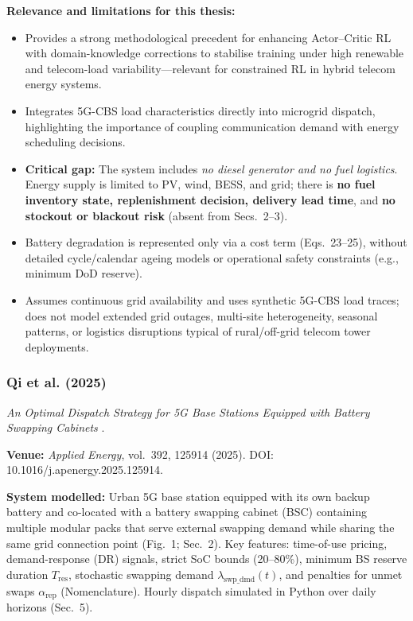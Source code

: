 \textbf{Relevance and limitations for this thesis:}
\begin{itemize}
    \item Provides a strong methodological precedent for enhancing Actor--Critic RL with domain-knowledge corrections to stabilise training under high renewable and telecom-load variability—relevant for constrained RL in hybrid telecom energy systems.
    \item Integrates 5G-CBS load characteristics directly into microgrid dispatch, highlighting the importance of coupling communication demand with energy scheduling decisions.
    \item \textbf{Critical gap:} The system includes \emph{no diesel generator and no fuel logistics}. Energy supply is limited to PV, wind, BESS, and grid; there is \textbf{no fuel inventory state, replenishment decision, delivery lead time}, and \textbf{no stockout or blackout risk} (absent from Secs.~2--3).
    \item Battery degradation is represented only via a cost term (Eqs.~23--25), without detailed cycle/calendar ageing models or operational safety constraints (e.g., minimum DoD reserve).
    \item Assumes continuous grid availability and uses synthetic 5G-CBS load traces; does not model extended grid outages, multi-site heterogeneity, seasonal patterns, or logistics disruptions typical of rural/off-grid telecom tower deployments.
\end{itemize}

\subsubsection{Qi et al. (2025)}
\label{sec:qi-et-al}
\textit{An Optimal Dispatch Strategy for 5G Base Stations Equipped with Battery Swapping Cabinets} \cite{qi_2025_battery_swapping_inventory}.

\textbf{Venue:} \textit{Applied Energy}, vol.~392, 125914 (2025). DOI: 10.1016/j.apenergy.2025.125914.

\textbf{System modelled:} Urban 5G base station equipped with its own backup battery and co-located with a battery swapping cabinet (BSC) containing multiple modular packs that serve external swapping demand while sharing the same grid connection point (Fig.~1; Sec.~2). Key features: time-of-use pricing, demand-response (DR) signals, strict SoC bounds (20--80\%), minimum BS reserve duration $T_{\mathrm{res}}$, stochastic swapping demand $\lambda_{\mathrm{swp\_dmd}}(t)$, and penalties for unmet swaps $\alpha_{\mathrm{rep}}$ (Nomenclature). Hourly dispatch simulated in Python over daily horizons (Sec.~5).

